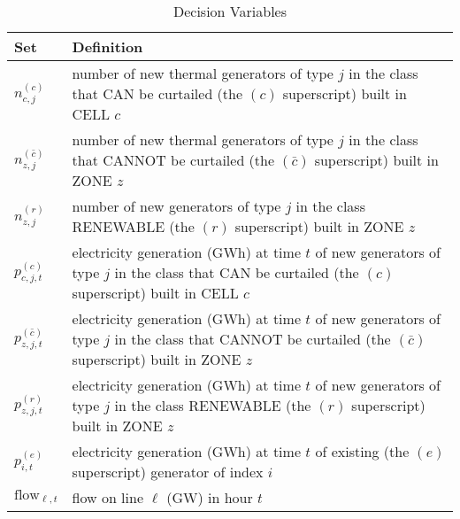 \documentclass[11pt, oneside]{article}   	%
\newcommand{\flow}{\text{flow}}
\newcommand{\bc}{\bar{c}}
\begin{document}
\begin{table}[H]
   \centering
   \caption{Decision Variables}
   \begin{tabular}{p{1in} p{4in} } %
      \toprule
      \textbf{Set} & \textbf{Definition} \\
      \midrule
      $n^{(c)}_{c, j}$ & number of new thermal generators of type $j$ in the class that CAN be curtailed (the $(c)$ superscript) built in CELL $c$\\
      $n^{(\bc)}_{z, j}$ & number of new thermal generators of type $j$ in the class that CANNOT be curtailed (the $(\bc)$ superscript) built in ZONE $z$\\
      $n^{(r)}_{z, j}$ & number of new generators of type $j$ in the class RENEWABLE (the $(r)$ superscript) built in ZONE $z$\\
      $p^{(c)}_{c, j, t}$ & electricity generation (GWh) at time $t$ of new generators  of type $j$ in the  class that CAN be curtailed (the $(c)$ superscript) built in CELL $c$\\
      $p^{(\bc)}_{z, j, t}$ & electricity generation (GWh) at time $t$ of new generators of type $j$ in the class that CANNOT be curtailed (the $(\bc)$ superscript) built in ZONE $z$\\
      $p^{(r)}_{z, j, t}$ & electricity generation (GWh) at time $t$ of new generators  of type $j$ in the class RENEWABLE (the $(r)$ superscript) built in ZONE $z$\\
      $p^{(e)}_{i, t}$ & electricity generation (GWh) at time $t$ of existing (the $(e)$ superscript) generator of index $i$ \\
      $\flow_{\ell, t}$ & flow on line $\ell$ (GW) in hour $t$\\
%
      \bottomrule
   \end{tabular}
   \label{tab:decision}
\end{table}
\end{document}
